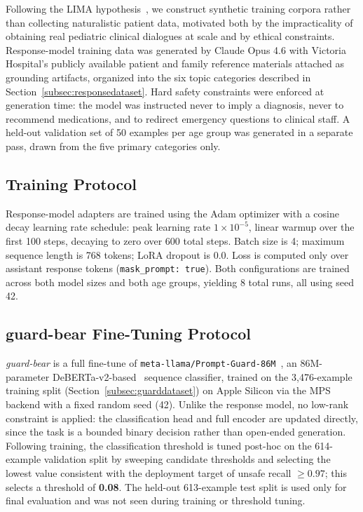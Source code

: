 \documentclass[pdflatex,sn-mathphys-num]{sn-jnl}%
\begin{document}
Following the LIMA hypothesis~\cite{zhou2023lima}, we construct synthetic training corpora rather than collecting naturalistic patient data, motivated both by the impracticality of obtaining real pediatric clinical dialogues at scale and by ethical constraints. Response-model training data was generated by Claude Opus 4.6 with Victoria Hospital's publicly available patient and family reference materials attached as grounding artifacts, organized into the six topic categories described in Section~\ref{subsec:responsedataset}. Hard safety constraints were enforced at generation time: the model was instructed never to imply a diagnosis, never to recommend medications, and to redirect emergency questions to clinical staff. A held-out validation set of 50 examples per age group was generated in a separate pass, drawn from the five primary categories only.

\subsection{Training Protocol}\label{sec:trainprotocol}

Response-model adapters are trained using the Adam optimizer with a cosine decay learning rate schedule: peak learning rate $1 \times 10^{-5}$, linear warmup over the first 100 steps, decaying to zero over 600 total steps. Batch size is 4; maximum sequence length is 768 tokens; LoRA dropout is 0.0. Loss is computed only over assistant response tokens (\texttt{mask\_prompt: true}). Both configurations are trained across both model sizes and both age groups, yielding 8 total runs, all using seed 42.

\subsection{guard-bear Fine-Tuning Protocol}\label{sec:guardmethod}

\textit{guard-bear} is a full fine-tune of \texttt{meta-llama/Prompt-Guard-86M}~\cite{promptguard2024}, an 86M-parameter DeBERTa-v2-based~\cite{he2021deberta} sequence classifier, trained on the 3{,}476-example training split (Section~\ref{subsec:guarddataset}) on Apple Silicon via the MPS backend with a fixed random seed (42). Unlike the response model, no low-rank constraint is applied: the classification head and full encoder are updated directly, since the task is a bounded binary decision rather than open-ended generation. Following training, the classification threshold is tuned post-hoc on the 614-example validation split by sweeping candidate thresholds and selecting the lowest value consistent with the deployment target of unsafe recall $\geq 0.97$; this selects a threshold of \textbf{0.08}. The held-out 613-example test split is used only for final evaluation and was not seen during training or threshold tuning.
\end{document}
